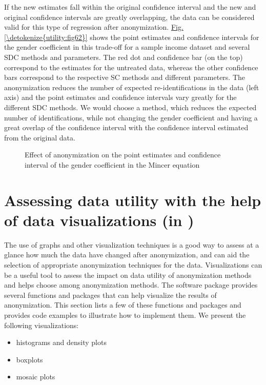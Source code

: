 \documentclass[letterpaper,10pt,english]{sphinxmanual}
\begin{document}
If the new estimates fall within the original confidence interval and
the new and original confidence intervals are greatly overlapping, the
data can be considered valid for this type of regression after
anonymization. \hyperref[\detokenize{utility:fig62}]{Fig.\@ \ref{\detokenize{utility:fig62}}} shows the point estimates and confidence
intervals for the gender coefficient in this trade-off for a sample
income dataset and several SDC methods and parameters. The red dot and
confidence bar (on the top) correspond to the estimates for the
untreated data, whereas the other confidence bars correspond to the
respective SC methods and different parameters. The anonymization
reduces the number of expected re-identifications in the data (left
axis) and the point estimates and confidence intervals vary greatly for
the different SDC methods. We would choose a method, which reduces the
expected number of identifications, while not changing the gender
coefficient and having a great overlap of the confidence interval with
the confidence interval estimated from the original data.

\begin{figure}[htbp]
\centering
\capstart

\noindent{}
\caption{Effect of anonymization on the point estimates and confidence interval of the gender coefficient in the Mincer equation}\label{\detokenize{utility:fig62}}\label{\detokenize{utility:id4}}\end{figure}


\section{Assessing data utility with the help of data visualizations (in )}
\label{\detokenize{utility:assessing-data-utility-with-the-help-of-data-visualizations-in-r}}
The use of graphs and other visualization techniques is a good way to
assess at a glance how much the data have changed after anonymization,
and can aid the selection of appropriate anonymization techniques for
the data. Visualizations can be a useful tool to assess the impact on
data utility of anonymization methods and helps choose among
anonymization methods. The software package  provides several
functions and packages that can help visualize the results of
anonymization. This section lists a few of these functions and packages
and provides code examples to illustrate how to implement them. We
present the following visualizations:
\begin{itemize}
\item {} 
histograms and density plots

\item {} 
boxplots

\item {} 
mosaic plots

\end{itemize}
\end{document}
